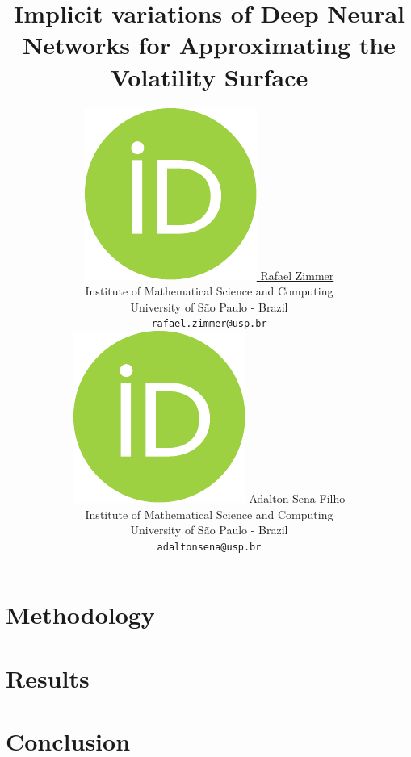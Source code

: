\documentclass{article}
\title{Implicit variations of Deep Neural Networks for Approximating the Volatility Surface}
\author{ 
	\href{https://orcid.org/0009-0008-6064-9895}{
		\includegraphics[scale=0.06]{resources/orcid.pdf}
		\hspace{1mm}Rafael Zimmer
	}\\
	Institute of Mathematical Science and Computing\\
	University of São Paulo - Brazil \\
	\texttt{rafael.zimmer@usp.br} \\
	\And
	\href{https://orcid.org/0000-0000-0000-0000}{
		\includegraphics[scale=0.06]{resources/orcid.pdf}
		\hspace{1mm}Adalton Sena Filho
	}\\
	Institute of Mathematical Science and Computing\\
	University of São Paulo - Brazil \\
	\texttt{adaltonsena@usp.br} \\
}
\begin{document}
	\maketitle
	
	\begin{abstract}
		
	\end{abstract}
	
	
	
	
	
	
	\section{Methodology}
	
	
	\section{Results}
	
	
	\section{Conclusion}
	
	
	
	
\end{document}
